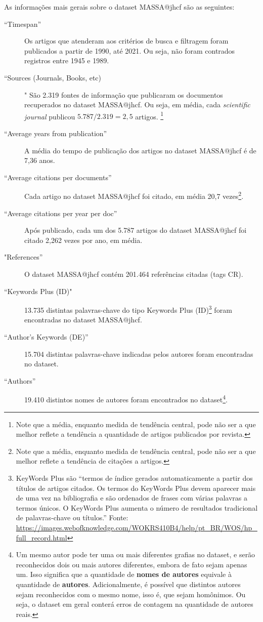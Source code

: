 As informações mais gerais sobre o dataset MASSA@jhcf são as seguintes:
\begin{description}
    \item [``Timespan''] Os artigos que atenderam aos critérios de busca e filtragem foram publicados a partir de 1990, até 2021. Ou seja, não foram contrados registros entre 1945 e 1989.
    \item [``Sources (Journals, Books, etc)]" São 2.319 fontes de informação que publicaram os documentos recuperados no dataset MASSA@jhcf. Ou seja, em média, cada \textit{scientific journal} publicou $5.787/2.319=2,5$ artigos. \footnote{Note que a média, enquanto medida de tendência central, pode não ser a que melhor reflete a tendência a quantidade de artigos publicados por revista.}
    \item [``Average years from publication''] A média do tempo de publicação dos artigos no dataset MASSA@jhcf é de 7,36 anos.
    \item [``Average citations per documents''] Cada artigo no dataset MASSA@jhcf foi citado, em média 20,7 vezes\footnote{Note que a média, enquanto medida de tendência central, pode não ser a que melhor reflete a tendência de  citações a artigos.}.
    \item [``Average citations per year per doc''] Após publicado, cada um dos 5.787 artigos do dataset MASSA@jhcf  foi citado 2,262 vezes por ano, em média.
    \item [ "References''] O dataset MASSA@jhcf contém 201.464 referências citadas (tags CR).
    \item [``Keywords Plus (ID)" ] 13.735 distintas palavras-chave do tipo Keywords Plus (ID)\footnote{KeyWords Plus são ``termos de índice gerados automaticamente a partir dos títulos de artigos citados. Os termos do KeyWords Plus devem aparecer mais de uma vez na bibliografia e são ordenados de frases com várias palavras a termos únicos. O KeyWords Plus aumenta o número de resultados tradicional de palavras-chave ou títulos.'' Fonte: \url{https://images.webofknowledge.com/WOKRS410B4/help/pt_BR/WOS/hp_full_record.html}} foram encontradas no dataset MASSA@jhcf. 
    \item [``Author's Keywords (DE)''] 15.704 distintas palavras-chave indicadas pelos autores foram encontradas no dataset.
    \item [``Authors''] 19.410 distintos nomes de autores foram encontrados no dataset\footnote{Um mesmo autor pode ter uma ou mais diferentes grafias no dataset, e serão reconhecidos dois ou mais autores diferentes, embora de fato sejam apenas um. Isso significa que a quantidade de \textbf{nomes de autores} equivale à quantidade de \textbf{autores}. Adicionalmente, é possível que distintos autores sejam reconhecidos com o mesmo nome, isso é, que sejam homônimos. Ou seja, o dataset em geral conterá erros de contagem na quantidade de autores reais.}.

\end{description}
